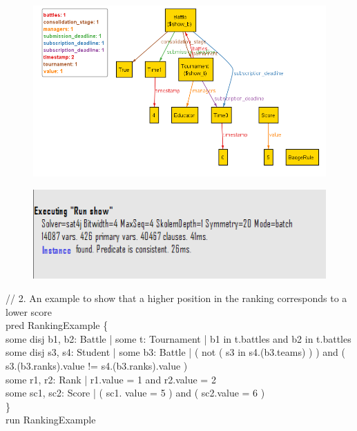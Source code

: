 \documentclass{Configuration_Files/Template}
\begin{document}
\begin{figure}[H]
\includegraphics[scale = 0.7]{Images/Alloy/1Model.png}\\
\centering
\end{figure}
\begin{figure}[H]
\includegraphics[scale = 0.7]{Images/Alloy/1Outcome.png}\\
\centering
\end{figure}

//  2. An example to show that a higher position in the ranking corresponds to a lower score\\

pred RankingExample \{\\
some disj b1, b2: Battle | some t: Tournament | b1 in t.battles and b2 in t.battles\\
some disj s3, s4: Student | some b3: Battle | ( not ( s3 in s4.(b3.teams) ) ) and ( s3.(b3.ranks).value != s4.(b3.ranks).value )\\
some r1, r2: Rank | r1.value = 1 and r2.value = 2\\
some sc1, sc2: Score | ( sc1. value = 5 ) and ( sc2.value = 6 )\\
\}\\
run RankingExample\\
\end{document}
